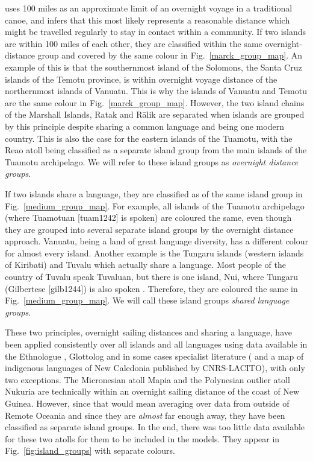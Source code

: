 \documentclass[a4paper,10pt]{article} %
\begin{document}
\citet{mark_1986, marck2000} uses 100 miles as an approximate limit of an overnight voyage in a traditional canoe, and infers that this most likely represents a reasonable distance which might be travelled regularly to stay in contact within a community. If two islands are within 100 miles of each other, they are classified within the same overnight-distance group and covered by the same colour in Fig.~\ref{marck_group_map}. An example of this is that the southernmost island of the Solomons, the Santa Cruz islands of the Temotu province, is within overnight voyage distance of the northernmost islands of Vanuatu. This is why the islands of Vanuatu and Temotu are the same colour in Fig.~\ref{marck_group_map}. However, the two island chains of the Marshall Islands, Ratak and R\={a}lik are separated when islands are grouped by this principle despite sharing a common language and being one modern country. This is also the case for the eastern islands of the Tuamotu, with the Reao atoll being classified as a separate island group from the main islands of the Tuamotu archipelago. We will refer to these island groups as \textit{overnight distance groups}. 

If two islands share a language, they are classified as of the same island group in Fig.~\ref{medium_group_map}. For example, all islands of the Tuamotu archipelago (where Tuamotuan [tuam1242] is spoken) are coloured the same, even though they are grouped into several separate island groups by the overnight distance approach. Vanuatu, being a land of great language diversity, has a different colour for almost every island. Another example is the Tungaru islands (western islands of Kiribati) and Tuvalu which actually share a language. Most people of the country of Tuvalu speak Tuvaluan, but there is one island, Nui, where Tungaru (Gilbertese [gilb1244]) is also spoken \citep{faaniu1983tuvalu, macdonald_2020, omniglot_tuvaluan}. Therefore, they are coloured the same in Fig.~\ref{medium_group_map}. We will call these island groups \textit{shared language groups}.

These two principles, overnight sailing distances and sharing a language, have been applied consistently over all islands and all languages using data available in the Ethnologue \citep{ethnologue22}, Glottolog \citep{glottolog40} and in some cases specialist literature (\citet{faaniu1983tuvalu,charpentier2012linguistic, francoisetatl2015, macdonald_2020, omniglot_tuvaluan} and a map of indigenous languages of New Caledonia published by CNRS-LACITO), with only two exceptions. The Micronesian atoll Mapia and the Polynesian outlier atoll Nukuria are technically within an overnight sailing distance of the coast of New Guinea. However, since that would mean averaging over data from outside of Remote Oceania and since they are \emph{almost} far enough away, they have been classified as separate island groups. In the end, there was too little data available for these two atolls for them to be included in the models. They appear in Fig.~\ref{fig:island_groups} with separate colours.
\end{document}

